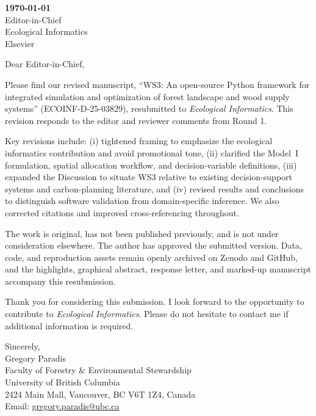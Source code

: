 \documentclass[11pt]{article}
\begin{document}

\noindent\textbf{\today} \\[1em]
\noindent Editor-in-Chief \\Ecological Informatics \\Elsevier

\bigskip

\noindent Dear Editor-in-Chief,

\medskip

Please find our revised manuscript, ``WS3: An open-source Python framework for integrated simulation and optimization of forest landscape and wood supply systems'' (ECOINF-D-25-03829), resubmitted to \emph{Ecological Informatics}. This revision responds to the editor and reviewer comments from Round 1.

Key revisions include: (i) tightened framing to emphasize the ecological informatics contribution and avoid promotional tone, (ii) clarified the Model~I formulation, spatial allocation workflow, and decision-variable definitions, (iii) expanded the Discussion to situate WS3 relative to existing decision-support systems and carbon-planning literature, and (iv) revised results and conclusions to distinguish software validation from domain-specific inference. We also corrected citations and improved cross-referencing throughout.

The work is original, has not been published previously, and is not under consideration elsewhere. The author has approved the submitted version. Data, code, and reproduction assets remain openly archived on Zenodo and GitHub, and the highlights, graphical abstract, response letter, and marked-up manuscript accompany this resubmission.

Thank you for considering this submission. I look forward to the opportunity to contribute to \emph{Ecological Informatics}. Please do not hesitate to contact me if additional information is required.

\bigskip

\noindent Sincerely, \\[0.75em]
\noindent Gregory Paradis \\Faculty of Forestry \& Environmental Stewardship \\University of British Columbia \\2424 Main Mall, Vancouver, BC V6T 1Z4, Canada \\Email: \href{mailto:gregory.paradis@ubc.ca}{gregory.paradis@ubc.ca}
\end{document}
